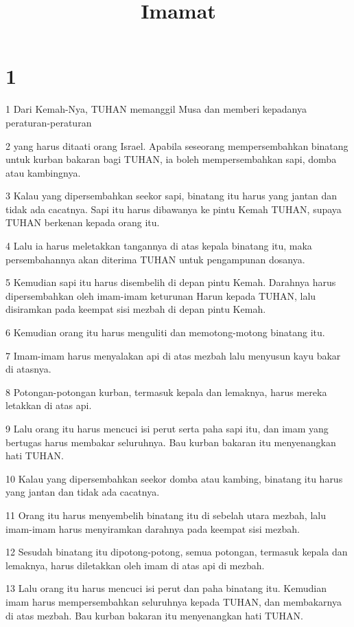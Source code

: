 

\title{Imamat}


\chapter{1}

\par 1 Dari Kemah-Nya, TUHAN memanggil Musa dan memberi kepadanya peraturan-peraturan
\par 2 yang harus ditaati orang Israel. Apabila seseorang mempersembahkan binatang untuk kurban bakaran bagi TUHAN, ia boleh mempersembahkan sapi, domba atau kambingnya.
\par 3 Kalau yang dipersembahkan seekor sapi, binatang itu harus yang jantan dan tidak ada cacatnya. Sapi itu harus dibawanya ke pintu Kemah TUHAN, supaya TUHAN berkenan kepada orang itu.
\par 4 Lalu ia harus meletakkan tangannya di atas kepala binatang itu, maka persembahannya akan diterima TUHAN untuk pengampunan dosanya.
\par 5 Kemudian sapi itu harus disembelih di depan pintu Kemah. Darahnya harus dipersembahkan oleh imam-imam keturunan Harun kepada TUHAN, lalu disiramkan pada keempat sisi mezbah di depan pintu Kemah.
\par 6 Kemudian orang itu harus menguliti dan memotong-motong binatang itu.
\par 7 Imam-imam harus menyalakan api di atas mezbah lalu menyusun kayu bakar di atasnya.
\par 8 Potongan-potongan kurban, termasuk kepala dan lemaknya, harus mereka letakkan di atas api.
\par 9 Lalu orang itu harus mencuci isi perut serta paha sapi itu, dan imam yang bertugas harus membakar seluruhnya. Bau kurban bakaran itu menyenangkan hati TUHAN.
\par 10 Kalau yang dipersembahkan seekor domba atau kambing, binatang itu harus yang jantan dan tidak ada cacatnya.
\par 11 Orang itu harus menyembelih binatang itu di sebelah utara mezbah, lalu imam-imam harus menyiramkan darahnya pada keempat sisi mezbah.
\par 12 Sesudah binatang itu dipotong-potong, semua potongan, termasuk kepala dan lemaknya, harus diletakkan oleh imam di atas api di mezbah.
\par 13 Lalu orang itu harus mencuci isi perut dan paha binatang itu. Kemudian imam harus mempersembahkan seluruhnya kepada TUHAN, dan membakarnya di atas mezbah. Bau kurban bakaran itu menyenangkan hati TUHAN.
